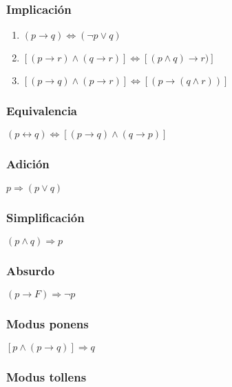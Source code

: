     \subsubsection{Implicaci\'on}
      \renewcommand{\labelenumi}{\alph{enumi})}
	\begin{enumerate}

	  \item $(p \rightarrow q) \Leftrightarrow (\neg p \vee q)$
	  
	  \item $[(p \rightarrow r) \wedge (q \rightarrow r )] \Leftrightarrow [(p \wedge q) \rightarrow r )]$

	  \item $[(p \rightarrow q) \wedge (p \rightarrow r )] \Leftrightarrow [(p \rightarrow  (q \wedge r) )]$
	\end{enumerate}
	

    \subsubsection{Equivalencia}

    $(p \leftrightarrow q)\Leftrightarrow[(p \rightarrow q) \wedge (q \rightarrow p)]$

    \subsubsection{Adici\'on}

    $p \Rightarrow (p \vee q)$

    \subsubsection{Simplificaci\'on}

    $(p \wedge q) \Rightarrow p$

    \subsubsection{Absurdo}

    $(p \rightarrow F)\Rightarrow \neg p$

    \subsubsection{Modus ponens}

    $[p \wedge (p \rightarrow q)] \Rightarrow q$

    \subsubsection{Modus tollens}

